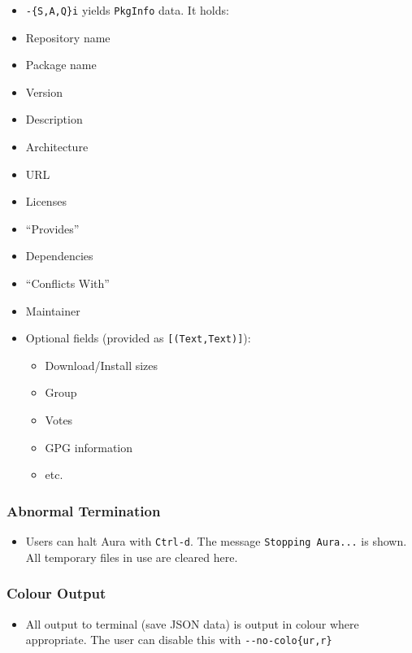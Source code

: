 \documentclass{article}
\begin{document}
\begin{itemize}
\itemsep1pt\parskip0pt
\item
  \texttt{-\{S,A,Q\}i} yields \texttt{PkgInfo} data. It holds:
\item
  Repository name
\item
  Package name
\item
  Version
\item
  Description
\item
  Architecture
\item
  URL
\item
  Licenses
\item
  ``Provides''
\item
  Dependencies
\item
  ``Conflicts With''
\item
  Maintainer
\item
  Optional fields (provided as \texttt{{[}(Text,Text){]}}):

  \begin{itemize}
  \itemsep1pt\parskip0pt
  \item
    Download/Install sizes
  \item
    Group
  \item
    Votes
  \item
    GPG information
  \item
    etc.
  \end{itemize}
\end{itemize}

\subsubsection{Abnormal Termination}\label{abnormal-termination}

\begin{itemize}
\itemsep1pt\parskip0pt
\item
  Users can halt Aura with \texttt{Ctrl-d}. The message
  \texttt{Stopping Aura...} is shown. All temporary files in use are
  cleared here.
\end{itemize}

\subsubsection{Colour Output}\label{colour-output}

\begin{itemize}
\itemsep1pt\parskip0pt
\item
  All output to terminal (save JSON data) is output in colour where
  appropriate. The user can disable this with
  \texttt{-\/-no-colo\{ur,r\}}
\end{itemize}
\end{document}
